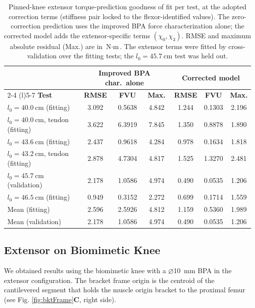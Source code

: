 \begin{table}[htbp]
\caption{Pinned-knee extensor torque-prediction goodness of fit per test, at the adopted correction terms (stiffness pair locked to the flexor-identified values). The zero-correction prediction uses the improved BPA force characterization alone; the corrected model adds the extensor-specific terms $(\chi_{0}, \chi_{3})$. RMSE and maximum absolute residual (Max.) are in $\text{N}\cdot\text{m}$. The extensor terms were fitted by cross-validation over the fitting tests; the $l_{0}=\qty{45.7}{\cm}$ test was held out.}
\label{tab:ExtPinGof}
\begin{tabular}{@{}lcccccc@{}}
\toprule
& \multicolumn{3}{c}{\textbf{Improved BPA char.\ alone}} & \multicolumn{3}{c}{\textbf{Corrected model}} \\
\cmidrule(lr){2-4} \cmidrule(l){5-7}
\textbf{Test} & \textbf{RMSE} & \textbf{FVU} & \textbf{Max.} & \textbf{RMSE} & \textbf{FVU} & \textbf{Max.} \\
\midrule
$l_{0}=\qty{40.0}{\cm}$ (fitting)         & 3.092 & 0.5638 & 4.842 & 1.244 & 0.1303 & 2.196 \\
$l_{0}=\qty{40.0}{\cm}$, tendon (fitting) & 3.622 & 6.3919 & 7.845 & 1.350 & 0.8878 & 1.890 \\
$l_{0}=\qty{43.6}{\cm}$ (fitting)         & 2.437 & 0.9618 & 4.284 & 0.978 & 0.1634 & 1.818 \\
$l_{0}=\qty{43.2}{\cm}$, tendon (fitting) & 2.878 & 4.7304 & 4.817 & 1.525 & 1.3270 & 2.481 \\
$l_{0}=\qty{45.7}{\cm}$ (validation)      & 2.178 & 1.0586 & 4.974 & 0.490 & 0.0535 & 1.206 \\
$l_{0}=\qty{46.5}{\cm}$ (fitting)         & 0.949 & 0.3152 & 2.272 & 0.699 & 0.1714 & 1.559 \\
\midrule
Mean (fitting)                            & 2.596 & 2.5926 & 4.812 & 1.159 & 0.5360 & 1.989 \\
Mean (validation)                         & 2.178 & 1.0586 & 4.974 & 0.490 & 0.0535 & 1.206 \\
\bottomrule
\end{tabular}
\end{table} 


\subsection{Extensor on Biomimetic Knee}


We obtained results using the biomimetic knee with a $\diameter$\qty{10}{\mm} BPA in the extensor configuration. The bracket frame origin is the centroid of the cantilevered segment that holds the muscle origin bracket to the proximal femur (see Fig. \ref{fig:bktFrame}\textbf{C}, right side). 

